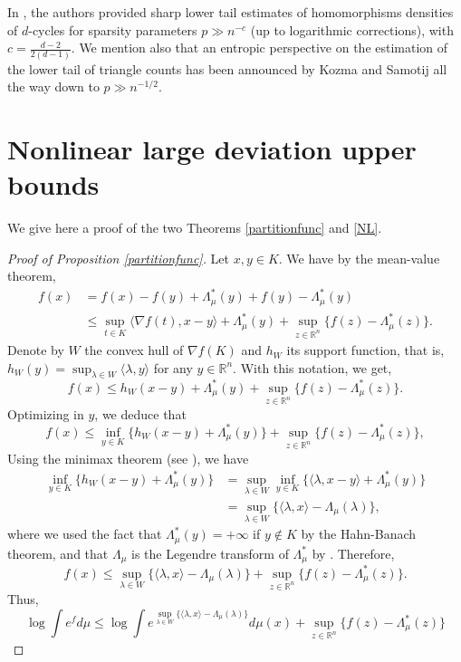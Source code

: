 \documentclass[aop,preprint]{imsart}
\newcommand\RR{\mathbb{R}}
\numberwithin{equation}{section}
\theoremstyle{definition}
\theoremstyle{plain}
\theoremstyle{remark}
\begin{document}
In \cite[Theorem 1.2]{CoD}, the authors provided sharp lower tail estimates of homomorphisms densities of $d$-cycles for sparsity parameters $p\gg n^{-c}$ (up to logarithmic corrections), with $c=\frac{d-2}{2(d-1)}$.    We mention also that an entropic perspective on the estimation of the lower tail of triangle counts has been announced by Kozma and Samotij \cite{KS} all the way down to  $p\gg n^{-1/2}$. 

\section{Nonlinear large deviation upper bounds}\label{upper}
We give here a proof of the two Theorems \ref{partitionfunc} and \ref{NL}. 
\begin{proof}[Proof of Proposition \ref{partitionfunc}]
Let $x,y\in K$. We have by the mean-value theorem,
\begin{align*} f(x) &= f(x) -f(y) + \Lambda^*_{\mu}(y) + f(y) - \Lambda^*_{\mu}(y)\\
& \leq \sup_{t\in K} \langle \nabla f(t),x-y\rangle +\Lambda^*_\mu(y) +\sup_{z \in \RR^n} \{ f(z) -\Lambda^*_\mu(z) \}.
\end{align*}
Denote by $W$ the convex hull of $\nabla f(K)$ and $h_W$ its support function, that is, $h_W(y) = \sup_{\lambda \in W} \langle \lambda , y\rangle$ for any $y\in \RR^n$. With this notation, we get,
$$ f(x) \leq h_W(x-y) +\Lambda^*_\mu(y) + \sup_{z \in \RR^n} \{ f(z) -\Lambda^*_\mu(z) \}.$$
Optimizing in $y$, we deduce that
$$ f(x) \leq  \inf_{ y\in K} \{ h_W(x-y) +\Lambda^*_\mu(y) \}+ \sup_{z \in \RR^n} \{ f(z) -\Lambda^*_\mu(z) \},$$
Using the minimax theorem (see \cite[Theorem 4.36]{Clarke}), we have
\begin{align*}
 \inf_{ y\in K} \{ h_W(x-y) +\Lambda^*_\mu(y) \} &= \sup_{\lambda \in W} \inf_{y\in K} \{\langle \lambda, x-y\rangle +\Lambda^*_\mu(y) \}\\
& =  \sup_{\lambda \in W} \{ \langle \lambda, x\rangle -\Lambda_\mu(\lambda)\},
\end{align*}
where we used the fact that $\Lambda^*_\mu(y) = +\infty$ if $y \notin K$ by the Hahn-Banach theorem, and that $\Lambda_\mu$ is the Legendre transform of $\Lambda^*_{\mu}$ by \cite[Theorem 4.21]{Clarke}.
Therefore,
$$f(x) \leq \sup_{\lambda \in W} \{\langle \lambda, x\rangle - \Lambda_\mu(\lambda) \} +  \sup_{z \in \RR^n} \{ f(z) -\Lambda^*_\mu(z) \}.$$
Thus,
\begin{equation} \label{laststep} \log \int e^f d\mu \leq \log \int e^{ \sup_{\lambda\in W} \{ \langle \lambda, x\rangle - \Lambda_{\mu}(\lambda)\}} d\mu(x) + \sup_{z \in \RR^n} \{ f(z) -\Lambda^*_\mu(z) \}\end{equation}

\end{proof}
\end{document}
